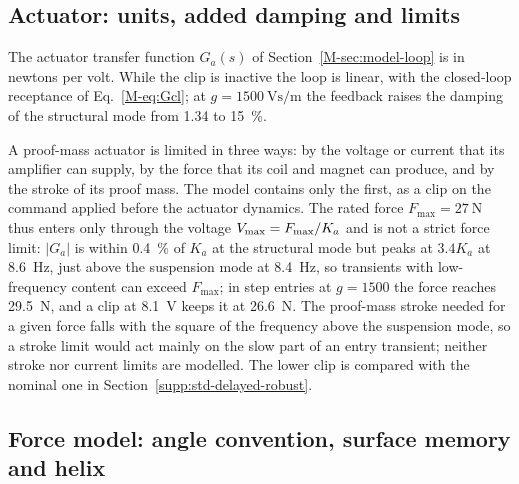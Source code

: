 \subsection{Actuator: units, added damping and limits}\label{supp:std-model-act}

The actuator transfer function $G_a(s)$ of Section~\ref{M-sec:model-loop} is in newtons per volt. While the clip is inactive the loop is linear, with the closed-loop receptance of Eq.~\eqref{M-eq:Gcl}; at $g=\SI{1500}{\volt\second\per\metre}$ the feedback raises the damping of the structural mode from 1.34 to \SI{15}{\percent}.

A proof-mass actuator is limited in three ways: by the voltage or current that its amplifier can supply, by the force that its coil and magnet can produce, and by the stroke of its proof mass. The model contains only the first, as a clip on the command applied before the actuator dynamics. The rated force $F_{\max}=\SI{27}{\newton}$ thus enters only through the voltage $V_{\max}=F_{\max}/K_a$ and is not a strict force limit: $\lvert G_a\rvert$ is within \SI{0.4}{\percent} of $K_a$ at the structural mode but peaks at $3.4K_a$ at \SI{8.6}{\hertz}, just above the suspension mode at \SI{8.4}{\hertz}, so transients with low-frequency content can exceed $F_{\max}$; in step entries at $g=1500$ the force reaches \SI{29.5}{\newton}, and a clip at \SI{8.1}{\volt} keeps it at \SI{26.6}{\newton}. The proof-mass stroke needed for a given force falls with the square of the frequency above the suspension mode, so a stroke limit would act mainly on the slow part of an entry transient; neither stroke nor current limits are modelled. The lower clip is compared with the nominal one in Section~\ref{supp:std-delayed-robust}.

\subsection{Force model: angle convention, surface memory and helix}\label{supp:std-model-force}

